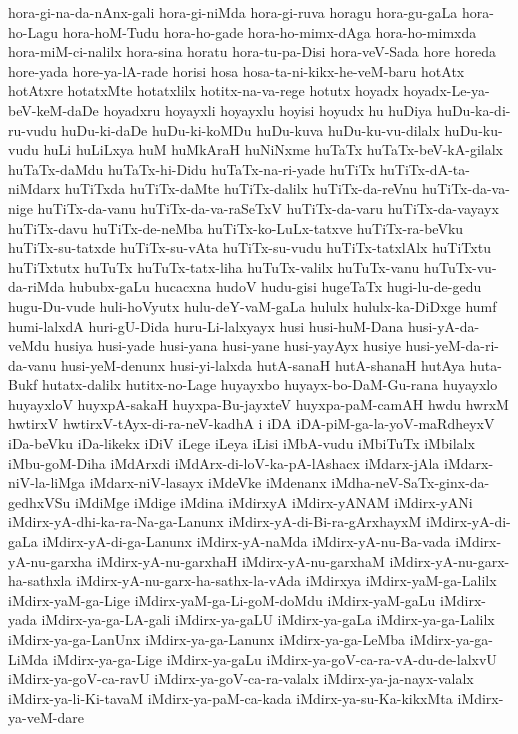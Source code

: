 {hora-gi-na-da-nAnx-gali
hora-gi-niMda
hora-gi-ruva
horagu
hora-gu-gaLa
hora-ho-Lagu
hora-hoM-Tudu
hora-ho-gade
hora-ho-mimx-dAga
hora-ho-mimxda
hora-miM-ci-nalilx
hora-sina
horatu
hora-tu-pa-Disi
hora-veV-Sada
hore
horeda
hore-yada
hore-ya-lA-rade
horisi
hosa
hosa-ta-ni-kikx-he-veM-baru
hotAtx
hotAtxre
hotatxMte
hotatxlilx
hotitx-na-va-rege
hotutx
hoyadx
hoyadx-Le-ya-beV-keM-daDe
hoyadxru
hoyayxli
hoyayxlu
hoyisi
hoyudx
hu
huDiya
huDu-ka-di-ru-vudu
huDu-ki-daDe
huDu-ki-koMDu
huDu-kuva
huDu-ku-vu-dilalx
huDu-ku-vudu
huLi
huLiLxya
huM
huMkAraH
huNiNxme
huTaTx
huTaTx-beV-kA-gilalx
huTaTx-daMdu
huTaTx-hi-Didu
huTaTx-na-ri-yade
huTiTx
huTiTx-dA-ta-niMdarx
huTiTxda
huTiTx-daMte
huTiTx-dalilx
huTiTx-da-reVnu
huTiTx-da-va-nige
huTiTx-da-vanu
huTiTx-da-va-raSeTxV
huTiTx-da-varu
huTiTx-da-vayayx
huTiTx-davu
huTiTx-de-neMba
huTiTx-ko-LuLx-tatxve
huTiTx-ra-beVku
huTiTx-su-tatxde
huTiTx-su-vAta
huTiTx-su-vudu
huTiTx-tatxlAlx
huTiTxtu
huTiTxtutx
huTuTx
huTuTx-tatx-liha
huTuTx-valilx
huTuTx-vanu
huTuTx-vu-da-riMda
hububx-gaLu
hucacxna
hudoV
hudu-gisi
hugeTaTx
hugi-lu-de-gedu
hugu-Du-vude
huli-hoVyutx
hulu-deY-vaM-gaLa
hululx
hululx-ka-DiDxge
humf
humi-lalxdA
huri-gU-Dida
huru-Li-lalxyayx
husi
husi-huM-Dana
husi-yA-da-veMdu
husiya
husi-yade
husi-yana
husi-yane
husi-yayAyx
husiye
husi-yeM-da-ri-da-vanu
husi-yeM-denunx
husi-yi-lalxda
hutA-sanaH
hutA-shanaH
hutAya
huta-Bukf
hutatx-dalilx
hutitx-no-Lage
huyayxbo
huyayx-bo-DaM-Gu-rana
huyayxlo
huyayxloV
huyxpA-sakaH
huyxpa-Bu-jayxteV
huyxpa-paM-camAH
hwdu
hwrxM
hwtirxV
hwtirxV-tAyx-di-ra-neV-kadhA
i
iDA
iDA-piM-ga-la-yoV-maRdheyxV
iDa-beVku
iDa-likekx
iDiV
iLege
iLeya
iLisi
iMbA-vudu
iMbiTuTx
iMbilalx
iMbu-goM-Diha
iMdArxdi
iMdArx-di-loV-ka-pA-lAshacx
iMdarx-jAla
iMdarx-niV-la-liMga
iMdarx-niV-lasayx
iMdeVke
iMdenanx
iMdha-neV-SaTx-ginx-da-gedhxVSu
iMdiMge
iMdige
iMdina
iMdirxyA
iMdirx-yANAM
iMdirx-yANi
iMdirx-yA-dhi-ka-ra-Na-ga-Lanunx
iMdirx-yA-di-Bi-ra-gArxhayxM
iMdirx-yA-di-gaLa
iMdirx-yA-di-ga-Lanunx
iMdirx-yA-naMda
iMdirx-yA-nu-Ba-vada
iMdirx-yA-nu-garxha
iMdirx-yA-nu-garxhaH
iMdirx-yA-nu-garxhaM
iMdirx-yA-nu-garx-ha-sathxla
iMdirx-yA-nu-garx-ha-sathx-la-vAda
iMdirxya
iMdirx-yaM-ga-Lalilx
iMdirx-yaM-ga-Lige
iMdirx-yaM-ga-Li-goM-doMdu
iMdirx-yaM-gaLu
iMdirx-yada
iMdirx-ya-ga-LA-gali
iMdirx-ya-gaLU
iMdirx-ya-gaLa
iMdirx-ya-ga-Lalilx
iMdirx-ya-ga-LanUnx
iMdirx-ya-ga-Lanunx
iMdirx-ya-ga-LeMba
iMdirx-ya-ga-LiMda
iMdirx-ya-ga-Lige
iMdirx-ya-gaLu
iMdirx-ya-goV-ca-ra-vA-du-de-lalxvU
iMdirx-ya-goV-ca-ravU
iMdirx-ya-goV-ca-ra-valalx
iMdirx-ya-ja-nayx-valalx
iMdirx-ya-li-Ki-tavaM
iMdirx-ya-paM-ca-kada
iMdirx-ya-su-Ka-kikxMta
iMdirx-ya-veM-dare
}

